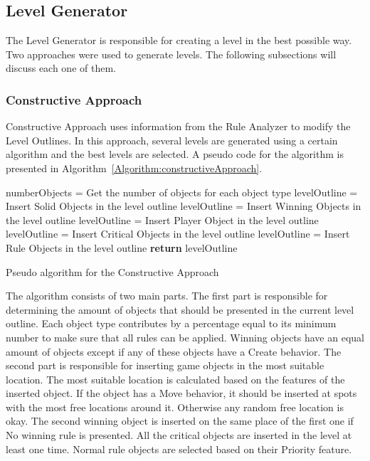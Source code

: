 \documentclass[letterpaper]{article}
\newcommand{\algref}[1]{Algorithm~\ref{Algorithm:#1}}
\begin{document}
\subsection{Level Generator}
The Level Generator is responsible for creating a level in the best possible way. Two approaches were used to generate levels. The following subsections will discuss each one of them.

\subsubsection{Constructive Approach}
Constructive Approach uses information from the Rule Analyzer to modify the Level Outlines. In this approach, several levels are generated using a certain algorithm and the best levels are selected. A pseudo code for the algorithm is presented in \algref{constructiveApproach}.\\\par

\setlength{\textfloatsep}{0pt}
\begin{algorithm}[ht]
	\BlankLine
	numberObjects = Get the number of objects for each object type\;
	\BlankLine
	levelOutline = Insert Solid Objects in the level outline\;
	levelOutline = Insert Winning Objects in the level outline\;
	levelOutline = Insert Player Object in the level outline\;
	levelOutline = Insert Critical Objects in the level outline\;
	levelOutline = Insert Rule Objects in the level outline\;
	\BlankLine
	\textbf{return} levelOutline\;
	\caption{Pseudo algorithm for the Constructive Approach}
	\label{Algorithm:constructiveApproach}
\end{algorithm}
\setlength{\textfloatsep}{10pt}

The algorithm consists of two main parts. The first part is responsible for determining the amount of objects that should be presented in the current level outline. Each object type contributes by a percentage equal to its minimum number to make sure that all rules can be applied. Winning objects have an equal amount of objects except if any of these objects have a Create behavior. The second part is responsible for inserting game objects in the most suitable location. The most suitable location is calculated based on the features of the inserted object. If the object has a Move behavior, it should be inserted at spots with the most free locations around it. Otherwise any random free location is okay. The second winning object is inserted on the same place of the first one if No winning rule is presented. All the critical objects are inserted in the level at least one time. Normal rule objects are selected based on their Priority feature.
\end{document}
